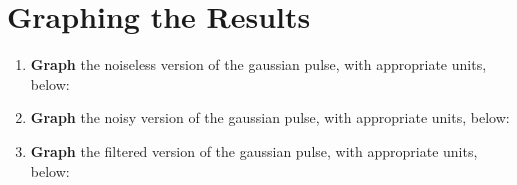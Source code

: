 \documentclass{article}
\begin{document}
\section{Graphing the Results}

\begin{enumerate}
\item \textbf{Graph} the noiseless version of the gaussian pulse, with appropriate units, below: \\ \vspace{5cm}
\item \textbf{Graph} the noisy version of the gaussian pulse, with appropriate units, below: \\ \vspace{5cm}
\item \textbf{Graph} the filtered version of the gaussian pulse, with appropriate units, below: \\ \vspace{5cm}
\end{enumerate}
\end{document}
